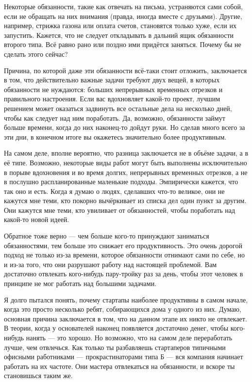 \documentclass[ebook,12pt,oneside,openany]{memoir}
\begin{document}
Некоторые обязанности, такие как отвечать на письма, устраняются сами
собой, если не обращать на них внимания (правда, иногда вместе с
друзьями). Другие, например, стрижка газона или оплата счетов,
становятся только хуже, если их запустить. Кажется, что не следует
откладывать в дальний ящик обязанности второго типа. Всё равно рано
или поздно ими придётся заняться. Почему бы не сделать этого сейчас? \newline

Причина, по которой даже эти обязанности всё-таки стоит отложить,
заключается в том, что действительно важные задачи требуют двух вещей,
в которых обязанности не нуждаются: больших непрерывных временных
отрезков и правильного настроения. Если вас вдохновляет какой-то
проект, лучшим решением может оказаться задвинуть все остальные дела
на несколько дней, чтобы как следует над ним поработать. Да, возможно,
обязанности займут больше времени, когда до них наконец-то дойдут
руки. Но сделав много всего за эти дни, в конечном итоге вы окажетесь
значительно более продуктивным. \newline

На самом деле, вполне вероятно, что разница заключается не в объёме
задачи, а в её типе. Возможно, некоторые виды работ могут быть
выполнены исключительно в порыве вдохновения и во время долгих,
непрерывных временных отрезков, а не в послушно распланированные
маленькие подходы. Эмпирически кажется, что так оно и есть. Когда я
думаю о людях, сделавших что-то великое, они не кажутся мне теми, кто
покорно вычёркивает из списка дел один пункт за другим. Они кажутся
мне теми, кто увиливает от обязанностей, чтобы поработать над какой-то
новой идеей. \newline

Обратное тоже верно — чем больше кого-то принуждают заниматься
обязанностями, тем больше это снижает его продуктивность. Это очень
дорогой подход не только из-за времени, которое обязанности отнимают
сами по себе, но и из-за того, что они разрушают работу над настоящей
проблемой. Вам достаточно отвлекать кого-нибудь пару-тройку раз за
день, чтобы этот человек в принципе не мог работать над большими
задачами. \newline

Я долго пытался понять, почему стартапы наиболее продуктивны в самом
начале, когда это просто несколько ребят, собирающихся дома у одного
из них. Думаю, основная причина заключается в том, что на данном этапе
их никто не отвлекает. В теории, когда у основателей наконец
появляется достаточно денег, чтобы кого-нибудь нанять — это хорошо. Но
возможно, что на самом деле переработать лучше, чем отвлечься. Как
только ты разбавляешь стартаперов типичными офисными работниками —
прокрастинаторами типа Б — вся компания начинает работать на их
частоте. Они мастера отвлекаться на обязанности, и вскоре ты
становишься таким же. \newline
\end{document}

